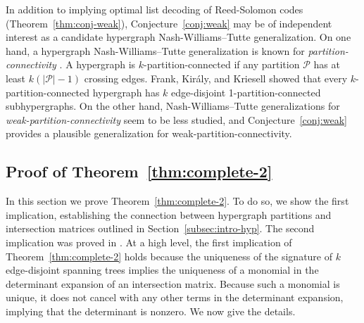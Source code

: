 \documentclass[11pt]{article}
\newcommand{\ryl}[1]{{\color{red} {\small [Ray: #1]}}}
\begin{document}
In addition to implying optimal list decoding of Reed-Solomon codes (Theorem~\ref{thm:conj-weak}), Conjecture~\ref{conj:weak} may be of independent interest as a candidate hypergraph Nash-Williams--Tutte generalization.
On one hand, a hypergraph Nash-Williams--Tutte generalization is known for \emph{partition-connectivity} \cite{frank2003decomposing}.
A hypergraph is $k$-partition-connected if any partition $\mathcal{P}$ has at least $k(|\mathcal{P}|-1)$ crossing edges.
Frank, Kir\'{a}ly, and Kriesell \cite{frank2003decomposing} showed that every $k$-partition-connected hypergraph has $k$ edge-disjoint 1-partition-connected subhypergraphs.
On the other hand, Nash-Williams--Tutte generalizations for \emph{weak-partition-connectivity} seem to be less studied, and Conjecture~\ref{conj:weak} provides a plausible generalization for weak-partition-connectivity.


































\subsection{Proof of Theorem~\ref{thm:complete-2}}\label{sec:complete}

In this section we prove Theorem~\ref{thm:complete-2}.
To do so, we show the first implication, establishing the connection between hypergraph partitions and intersection matrices outlined in Section~\ref{subsec:intro-hyp}.
The second implication was proved in \cite{shangguan2019combinatorial0}.
At a high level, the first implication of Theorem~\ref{thm:complete-2} holds because the uniqueness of the signature of $k$ edge-disjoint spanning trees implies the uniqueness of a monomial in the determinant expansion of an intersection matrix.
Because such a monomial is unique, it does not cancel with any other terms in the determinant expansion, implying that the determinant is nonzero.
We now give the details.
\end{document}

